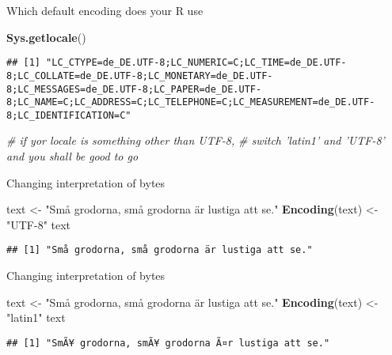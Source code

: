 \documentclass[ignorenonframetext,]{beamer}
\newenvironment{Shaded}{\begin{snugshade}}{\end{snugshade}}
\newcommand{\KeywordTok}[1]{\textcolor[rgb]{0.13,0.29,0.53}{\textbf{{#1}}}}
\newcommand{\StringTok}[1]{\textcolor[rgb]{0.31,0.60,0.02}{{#1}}}
\newcommand{\CommentTok}[1]{\textcolor[rgb]{0.56,0.35,0.01}{\textit{{#1}}}}
\newcommand{\NormalTok}[1]{{#1}}
\begin{document}
\begin{frame}[fragile]{Which default encoding does your R use}

\begin{Shaded}
\begin{Highlighting}[]
\KeywordTok{Sys.getlocale}\NormalTok{()}
\end{Highlighting}
\end{Shaded}

\begin{verbatim}
## [1] "LC_CTYPE=de_DE.UTF-8;LC_NUMERIC=C;LC_TIME=de_DE.UTF-8;LC_COLLATE=de_DE.UTF-8;LC_MONETARY=de_DE.UTF-8;LC_MESSAGES=de_DE.UTF-8;LC_PAPER=de_DE.UTF-8;LC_NAME=C;LC_ADDRESS=C;LC_TELEPHONE=C;LC_MEASUREMENT=de_DE.UTF-8;LC_IDENTIFICATION=C"
\end{verbatim}

\begin{Shaded}
\begin{Highlighting}[]
\CommentTok{# if yor locale is something other than UTF-8, }
\CommentTok{# switch 'latin1' and 'UTF-8' and you shall be good to go}
\end{Highlighting}
\end{Shaded}

\end{frame}

\begin{frame}[fragile]{Changing interpretation of bytes}

\begin{Shaded}
\begin{Highlighting}[]
\NormalTok{text <-}\StringTok{ "Små grodorna, små grodorna är lustiga att se."}
\KeywordTok{Encoding}\NormalTok{(text) <-}\StringTok{ "UTF-8"}
\NormalTok{text}
\end{Highlighting}
\end{Shaded}

\begin{verbatim}
## [1] "Små grodorna, små grodorna är lustiga att se."
\end{verbatim}

\end{frame}

\begin{frame}[fragile]{Changing interpretation of bytes}

\begin{Shaded}
\begin{Highlighting}[]
\NormalTok{text <-}\StringTok{ "Små grodorna, små grodorna är lustiga att se."}
\KeywordTok{Encoding}\NormalTok{(text) <-}\StringTok{ "latin1"}
\NormalTok{text}
\end{Highlighting}
\end{Shaded}

\begin{verbatim}
## [1] "SmÃ¥ grodorna, smÃ¥ grodorna Ã¤r lustiga att se."
\end{verbatim}

\end{frame}
\end{document}
